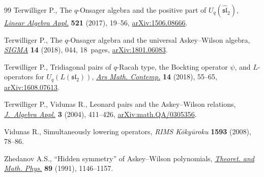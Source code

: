 \documentclass[pdftex]{sigma}
\numberwithin{equation}{section}
\begin{document}
\begin{thebibliography}{99}
Terwilliger P., The {$q$}-{O}nsager algebra and the positive part of
 {$U_q(\widehat{\mathfrak{sl}}_2)$}, \href{https://doi.org/10.1016/j.laa.2017.01.027}{\textit{Linear Algebra Appl.}}
 \textbf{521} (2017), 19--56, \href{https://arxiv.org/abs/1506.08666}{arXiv:1506.08666}.

Terwilliger P., The {$q$}-{O}nsager algebra and the universal {A}skey--{W}ilson
 algebra, \href{https://doi.org/10.3842/SIGMA.2018.044}{\textit{SIGMA}} \textbf{14} (2018), 044, 18~pages,
 \href{https://arxiv.org/abs/1801.06083}{arXiv:1801.06083}.

Terwilliger P., Tridiagonal pairs of {$q$}-{R}acah type, the {B}ockting
 operator {$\psi$}, and {$L$}-operators for {$U_q(L(\mathfrak{sl}_2))$},
 \href{https://doi.org/10.26493/1855-3974.1283.456}{\textit{Ars Math. Contemp.}} \textbf{14} (2018), 55--65, \href{https://arxiv.org/abs/1608.07613}{arXiv:1608.07613}.

Terwilliger P., Vidunas R., Leonard pairs and the {A}skey--{W}ilson relations,
 \href{https://doi.org/10.1142/S0219498804000940}{\textit{J.~Algebra Appl.}} \textbf{3} (2004), 411--426,
 \href{https://arxiv.org/abs/math.QA/0305356}{arXiv:math.QA/0305356}.

Vidunas R., Simultaneously lowering operators, \textit{RIMS K\=oky\=uroku}
 \textbf{1593} (2008), 78--86.

Zhedanov A.S., ``{H}idden symmetry'' of {A}skey--{W}ilson polynomials,
 \href{https://doi.org/10.1007/BF01015906}{\textit{Theoret. and Math. Phys.}} \textbf{89} (1991), 1146--1157.

\end{thebibliography}\LastPageEnding
\end{document}
